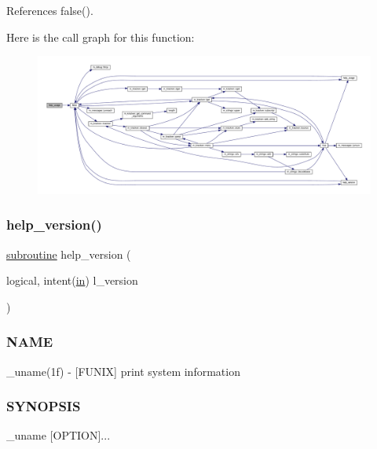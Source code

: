 References false().

Here is the call graph for this function\+:
\nopagebreak
\begin{figure}[H]
\begin{center}
\leavevmode
\includegraphics[width=350pt]{__uname_8f90_a3e09a3b52ee8fb04eeb93fe5761626a8_cgraph}
\end{center}
\end{figure}
\mbox{\label{__uname_8f90_a39c21619b08a3c22f19e2306efd7f766}} 
\subsubsection{\texorpdfstring{help\+\_\+version()}{help\_version()}}
{\footnotesize\ttfamily \hyperlink{M__stopwatch_83_8txt_acfbcff50169d691ff02d4a123ed70482}{subroutine} help\+\_\+version (\begin{DoxyParamCaption}\item[{logical, intent(\hyperlink{M__journal_83_8txt_afce72651d1eed785a2132bee863b2f38}{in})}]{l\+\_\+version }\end{DoxyParamCaption})}



\subsubsection*{N\+A\+ME}

\+\_\+uname(1f) -\/ \mbox{[}F\+U\+N\+IX\mbox{]} print system information 

\subsubsection*{S\+Y\+N\+O\+P\+S\+IS}

\begin{DoxyVerb}    _uname [OPTION]...
\end{DoxyVerb}


